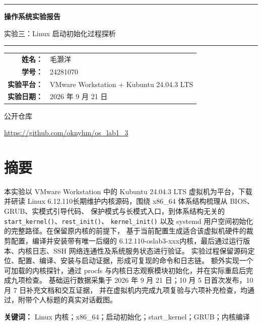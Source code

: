 \documentclass[UTF8,zihao=-4,openany,fontset=none]{ctexrep}
\newcommand{\kernelver}{6.12.110-oslab3-xxx}
\newcommand{\sourcever}{6.12.110}
\begin{document}
\begin{titlepage}
  \centering
  \vspace*{1.5cm}
  {\color{osblue}\rule{0.9\textwidth}{1.2pt}\par}
  \vspace{1.1cm}
  {\Huge\bfseries 操作系统实验报告\par}
  \vspace{0.7cm}
  {\LARGE 实验三：Linux 启动初始化过程探析\par}
  \vspace{1.1cm}
  {\color{osblue}\rule{0.9\textwidth}{1.2pt}\par}
  \vfill
  \renewcommand{\arraystretch}{1.7}
  \begin{tabular}{>{\bfseries}r l}
    姓名：& 毛灏洋 \\
    学号：& 24281070 \\
    实验平台：& VMware Workstation + Kubuntu 24.04.3 LTS \\
    实验日期：& 2026 年 9 月 21 日 \\
  \end{tabular}
  \vfill
  {\large 公开仓库\par}
  \vspace{0.3cm}
  \url{https://github.com/oknyhm/os_lab1_3}
\end{titlepage}

\chapter*{摘要}
本实验以 VMware Workstation 中的 Kubuntu 24.04.3 LTS 虚拟机为平台，下载并研读 Linux
\sourcever 长期维护内核源码，围绕 x86\_64 体系结构梳理从 BIOS、GRUB、实模式引导代码、
保护模式与长模式入口，到体系结构无关的 \texttt{start\_kernel()}、\texttt{rest\_init()}、
\texttt{kernel\_init()} 以及 systemd 用户空间初始化的完整路径。在保留原内核的前提下，
基于当前配置生成适合该虚拟机硬件的裁剪配置，编译并安装带有唯一后缀的
\kernelver 内核，最后通过运行版本、内核日志、SSH 网络连通性及系统服务状态进行验证。
实验过程保留源码定位、配置、编译、安装与启动证据，形成可复现的命令和日志链。
额外实现一个可加载的内核探针，通过 procfs 与内核日志观察模块初始化，并在实际重启后完成九项检查。
基础运行数据采集于 2026 年 9 月 21 日；10 月 5 日首次发布，10 月 7 日补充文档和交互证据，
并在虚拟机内完成九项复验与六项补充检查，均通过，附带个人标题的真实对话截图。

\textbf{关键词：} Linux 内核；x86\_64；启动初始化；start\_kernel；GRUB；内核编译
\end{document}
